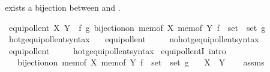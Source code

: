 \begin{isabellebody}
\begin{isamarkuptext}
exists a bijection between  and .%
\end{isamarkuptext}\isamarkuptrue%
\isamarkupfalse%
\ {\isachardoublequoteopen}equipollent\ X\ Y\ {\isasymequiv}\ {\isasymexists}f\ g{\isachardot}{\kern0pt}\ bijection{\isacharunderscore}{\kern0pt}on\ {\isacharparenleft}{\kern0pt}mem{\isacharunderscore}{\kern0pt}of\ X{\isacharparenright}{\kern0pt}\ {\isacharparenleft}{\kern0pt}mem{\isacharunderscore}{\kern0pt}of\ Y{\isacharparenright}{\kern0pt}\ {\isacharparenleft}{\kern0pt}f\ {\isacharcolon}{\kern0pt}{\isacharcolon}{\kern0pt}\ set\ {\isasymRightarrow}\ set{\isacharparenright}{\kern0pt}\ g{\isachardoublequoteclose}\isanewline
\isanewline
{}\isamarkupfalse%
\ hotg{\isacharunderscore}{\kern0pt}equipollent{\isacharunderscore}{\kern0pt}syntax\ \ \isamarkupfalse%
\ equipollent\ {\isacharparenleft}{\kern0pt}\ {\isachardoublequoteopen}{\isasymapprox}{\isachardoublequoteclose}\ {}{}{\isacharparenright}{\kern0pt}\ \isamarkupfalse%
\isanewline
{}\isamarkupfalse%
\ no{\isacharunderscore}{\kern0pt}hotg{\isacharunderscore}{\kern0pt}equipollent{\isacharunderscore}{\kern0pt}syntax\ \ \isamarkupfalse%
\ equipollent\ {\isacharparenleft}{\kern0pt}\ {\isachardoublequoteopen}{\isasymapprox}{\isachardoublequoteclose}\ {}{}{\isacharparenright}{\kern0pt}\ \isamarkupfalse%
\isanewline
{}\isamarkupfalse%
\ hotg{\isacharunderscore}{\kern0pt}equipollent{\isacharunderscore}{\kern0pt}syntax\isanewline
\isanewline
{}\isamarkupfalse%
\ equipollentI\ {\isacharbrackleft}{\kern0pt}intro{\isacharbrackright}{\kern0pt}{\isacharcolon}{\kern0pt}\isanewline
\ \ \ {\isachardoublequoteopen}bijection{\isacharunderscore}{\kern0pt}on\ {\isacharparenleft}{\kern0pt}mem{\isacharunderscore}{\kern0pt}of\ X{\isacharparenright}{\kern0pt}\ {\isacharparenleft}{\kern0pt}mem{\isacharunderscore}{\kern0pt}of\ Y{\isacharparenright}{\kern0pt}\ {\isacharparenleft}{\kern0pt}f\ {\isacharcolon}{\kern0pt}{\isacharcolon}{\kern0pt}\ set\ {\isasymRightarrow}\ set{\isacharparenright}{\kern0pt}\ g{\isachardoublequoteclose}\isanewline
\ \ \ {\isachardoublequoteopen}X\ {\isasymapprox}\ Y{\isachardoublequoteclose}\isanewline
%
\isadelimproof
\ \ %
\endisadelimproof
%
\isatagproof
{}\isamarkupfalse%
\ assms\ \isamarkupfalse%

\end{isabellebody}
